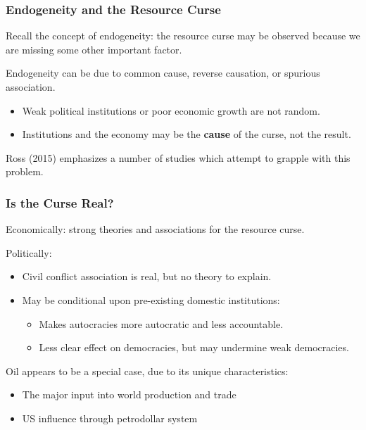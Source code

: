 \documentclass{beamer}
\begin{document}
\begin{frame} 
	\frametitle{\LARGE{Endogeneity and the Resource Curse}}
	\begin{itemize}
		\large{
			\item Recall the concept of endogeneity: the resource curse may be observed because we are missing some other important factor.
			\item Endogeneity can be due to common cause, reverse causation, or spurious association.
			\begin{itemize}
				\item Weak political institutions or poor economic growth are not random. \pause 
				\item Institutions and the economy may be the \textbf{cause} of the curse, not the result. \pause 
			\end{itemize}
			\item Ross (2015) emphasizes a number of studies which attempt to grapple with this problem.   
			
		}
	\end{itemize}
\end{frame}

\begin{frame} 
	\frametitle{\LARGE{Is the Curse Real?}}
	\begin{itemize}
		\large{ 
			\item Economically: strong theories and associations for the resource curse. \pause
			
			\item Politically: \pause
			\begin{itemize}
				\item Civil conflict association is real, but no theory to explain. \pause
				\item May be conditional upon pre-existing domestic institutions: \pause
				\begin{itemize}
					\item Makes autocracies more autocratic and less accountable. \pause
					\item Less clear effect on democracies, but may undermine weak democracies. \pause
				\end{itemize}
				
			\end{itemize}
			\item Oil appears to be a special case, due to its unique characteristics: \pause
			\begin{itemize}
				\item The major input into world production and trade\pause
				\item US influence through petrodollar system 
			\end{itemize}
		}
	\end{itemize}
\end{frame}
\end{document}
